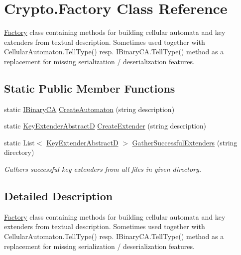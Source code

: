 \hypertarget{class_crypto_1_1_factory}{}\section{Crypto.\+Factory Class Reference}
\label{class_crypto_1_1_factory}


\hyperlink{class_crypto_1_1_factory}{Factory} class containing methods for building cellular automata and key extenders from textual description. Sometimes used together with {\ttfamily Cellular\+Automaton.\+Tell\+Type()} resp. {\ttfamily I\+Binary\+C\+A.\+Tell\+Type()} method as a replacement for missing serialization / deserialization features.  


\subsection*{Static Public Member Functions}
\begin{DoxyCompactItemize}
\item 
static \hyperlink{interface_cellular_1_1_i_binary_c_a}{I\+Binary\+C\+A} \hyperlink{class_crypto_1_1_factory_abe3a27bbc69843d3c912605709b75715}{Create\+Automaton} (string description)
\item 
static \hyperlink{class_crypto_1_1_key_extender_abstract_d}{Key\+Extender\+Abstract\+D} \hyperlink{class_crypto_1_1_factory_aec31ee8205c68b93aa3581aa4d8486d0}{Create\+Extender} (string description)
\item 
static List$<$ \hyperlink{class_crypto_1_1_key_extender_abstract_d}{Key\+Extender\+Abstract\+D} $>$ \hyperlink{class_crypto_1_1_factory_abd5015e25ff66c3cf46bab4d67e60ce5}{Gather\+Successful\+Extenders} (string directory)
\begin{DoxyCompactList}\small\item\em Gathers successful key extenders from all files in given directory. \end{DoxyCompactList}\end{DoxyCompactItemize}


\subsection{Detailed Description}
\hyperlink{class_crypto_1_1_factory}{Factory} class containing methods for building cellular automata and key extenders from textual description. Sometimes used together with {\ttfamily Cellular\+Automaton.\+Tell\+Type()} resp. {\ttfamily I\+Binary\+C\+A.\+Tell\+Type()} method as a replacement for missing serialization / deserialization features. 



